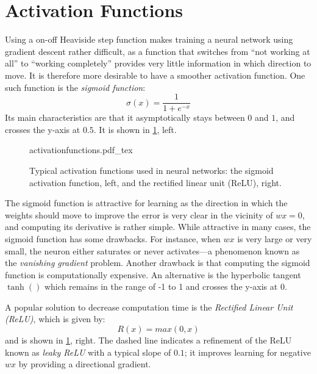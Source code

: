 \section{Activation Functions}\label{sec:activationfunctions}

Using a on-off Heaviside step function makes training a neural network using gradient descent rather difficult, as a function that switches from ``not working at all'' to ``working completely'' provides very little information in which direction to move. It is therefore more desirable to have a smoother activation function. One such function is the \textsl{sigmoid function}:
\begin{equation}
\sigma(x)=\frac{1}{1+e^{-x}}
\end{equation}
Its main characteristics are that it asymptotically stays between $0$ and $1$, and crosses the y-axis at $0.5$. It is shown in \cref{fig:activationfunctions}, left.

\begin{figure}[htb]
    \centering
    \def\svgwidth{0.9\textwidth}
    {activationfunctions.pdf_tex}
    \caption{Typical activation functions used in neural networks: the sigmoid activation function, left, and the rectified linear unit (ReLU), right.\label{fig:activationfunctions}}
\end{figure}

The sigmoid function is attractive for learning as the direction in which the weights should move to improve the error is very clear in the vicinity of $wx=0$, and computing its derivative is rather simple. While attractive in many cases, the sigmoid function has some drawbacks. For instance, when $wx$ is very large or very small, the neuron either saturates or never activates---a phenomenon known as the \textsl{vanishing gradient} problem. Another drawback is that computing the sigmoid function is computationally expensive. An alternative is the hyperbolic tangent $\tanh()$ which remains in the range of -1 to 1 and crosses the y-axis at 0.

A popular solution to decrease computation time is the \textsl{Rectified Linear Unit (ReLU)}, which is given by:
\begin{equation}
R(x)=max(0,x)
\end{equation}
and is shown in \cref{fig:activationfunctions}, right.
The dashed line indicates a refinement of the ReLU known as \textsl{leaky ReLU} with a typical slope of $0.1$; it improves learning for negative $wx$ by providing a directional gradient.

